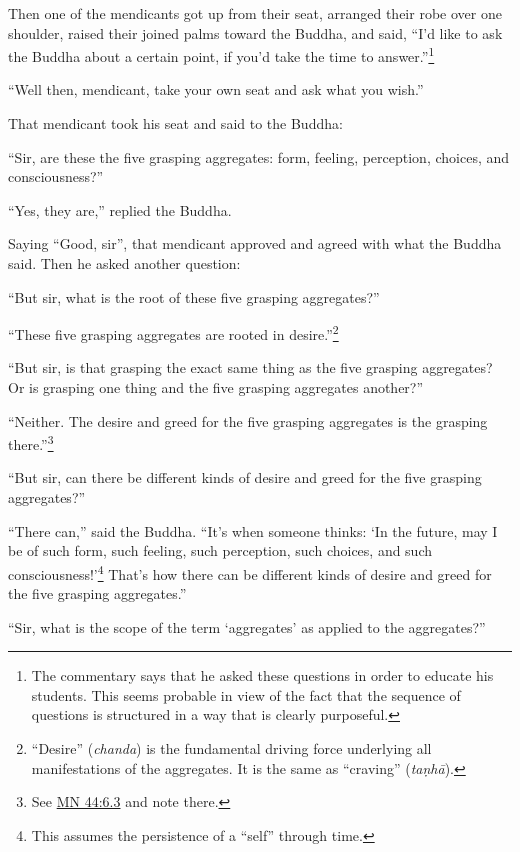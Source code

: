 \documentclass[12pt,openany]{book}%
\begin{document}
Then one of the mendicants got up from their seat, arranged their robe over one shoulder, raised their joined palms toward the Buddha, and said, “I’d like to ask the Buddha about a certain point, if you’d take the time to answer.”\footnote{The commentary says that he asked these questions in order to educate his students. This seems probable in view of the fact that the sequence of questions is structured in a way that is clearly purposeful. } 

“Well then, mendicant, take your own seat and ask what you wish.” 

That mendicant took his seat and said to the Buddha: 

“Sir, are these the five grasping aggregates: form, feeling, perception, choices, and consciousness?” 

“Yes, they are,” replied the Buddha. 

Saying “Good, sir”, that mendicant approved and agreed with what the Buddha said. Then he asked another question: 

“But sir, what is the root of these five grasping aggregates?” 

“These five grasping aggregates are rooted in desire.”\footnote{“Desire” (\textit{chanda}) is the fundamental driving force underlying all manifestations of the aggregates. It is the same as “craving” (\textit{\textsanskrit{taṇhā}}). } 

“But sir, is that grasping the exact same thing as the five grasping aggregates? Or is grasping one thing and the five grasping aggregates another?” 

“Neither. The desire and greed for the five grasping aggregates is the grasping there.”\footnote{See \href{https://suttacentral.net/mn44/en/sujato\#6.3}{MN 44:6.3} and note there. } 

“But sir, can there be different kinds of desire and greed for the five grasping aggregates?” 

“There can,” said the Buddha. “It’s when someone thinks: ‘In the future, may I be of such form, such feeling, such perception, such choices, and such consciousness!’\footnote{This assumes the persistence of a “self” through time. } That’s how there can be different kinds of desire and greed for the five grasping aggregates.” 

“Sir, what is the scope of the term ‘aggregates’ as applied to the aggregates?” 
\end{document}
